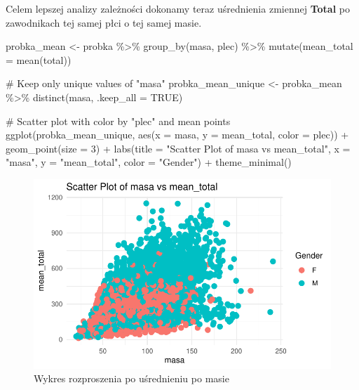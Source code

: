 \documentclass[
  letterpaper,
  DIV=11,
  numbers=noendperiod]{scrartcl}
\newenvironment{Shaded}{\begin{snugshade}}{\end{snugshade}}
\newcommand{\AttributeTok}[1]{\textcolor[rgb]{0.40,0.45,0.13}{#1}}
\newcommand{\CommentTok}[1]{\textcolor[rgb]{0.37,0.37,0.37}{#1}}
\newcommand{\ConstantTok}[1]{\textcolor[rgb]{0.56,0.35,0.01}{#1}}
\newcommand{\DecValTok}[1]{\textcolor[rgb]{0.68,0.00,0.00}{#1}}
\newcommand{\FunctionTok}[1]{\textcolor[rgb]{0.28,0.35,0.67}{#1}}
\newcommand{\NormalTok}[1]{\textcolor[rgb]{0.00,0.23,0.31}{#1}}
\newcommand{\OtherTok}[1]{\textcolor[rgb]{0.00,0.23,0.31}{#1}}
\newcommand{\SpecialCharTok}[1]{\textcolor[rgb]{0.37,0.37,0.37}{#1}}
\newcommand{\StringTok}[1]{\textcolor[rgb]{0.13,0.47,0.30}{#1}}
\begin{document}
Celem lepszej analizy zależności dokonamy teraz uśrednienia zmiennej
\textbf{Total} po zawodnikach tej samej płci o tej samej masie.

\begin{Shaded}
\begin{Highlighting}[]
\NormalTok{probka\_mean }\OtherTok{\textless{}{-}}\NormalTok{ probka }\SpecialCharTok{\%\textgreater{}\%}
  \FunctionTok{group\_by}\NormalTok{(masa, plec) }\SpecialCharTok{\%\textgreater{}\%}
  \FunctionTok{mutate}\NormalTok{(}\AttributeTok{mean\_total =} \FunctionTok{mean}\NormalTok{(total))}

\CommentTok{\# Keep only unique values of "masa"}
\NormalTok{probka\_mean\_unique }\OtherTok{\textless{}{-}}\NormalTok{ probka\_mean }\SpecialCharTok{\%\textgreater{}\%}
  \FunctionTok{distinct}\NormalTok{(masa, }\AttributeTok{.keep\_all =} \ConstantTok{TRUE}\NormalTok{)}

\CommentTok{\# Scatter plot with color by "plec" and mean points}
\FunctionTok{ggplot}\NormalTok{(probka\_mean\_unique, }\FunctionTok{aes}\NormalTok{(}\AttributeTok{x =}\NormalTok{ masa, }\AttributeTok{y =}\NormalTok{ mean\_total, }\AttributeTok{color =}\NormalTok{ plec)) }\SpecialCharTok{+}
  \FunctionTok{geom\_point}\NormalTok{(}\AttributeTok{size =} \DecValTok{3}\NormalTok{) }\SpecialCharTok{+}
  \FunctionTok{labs}\NormalTok{(}\AttributeTok{title =} \StringTok{"Scatter Plot of masa vs mean\_total"}\NormalTok{,}
       \AttributeTok{x =} \StringTok{"masa"}\NormalTok{, }\AttributeTok{y =} \StringTok{"mean\_total"}\NormalTok{, }\AttributeTok{color =} \StringTok{"Gender"}\NormalTok{) }\SpecialCharTok{+}
  \FunctionTok{theme\_minimal}\NormalTok{()}
\end{Highlighting}
\end{Shaded}

\begin{figure}[H]

{\centering \includegraphics{raport_files/figure-pdf/unnamed-chunk-21-1.pdf}

}

\caption{Wykres rozproszenia po uśrednieniu po masie}

\end{figure}
\end{document}
